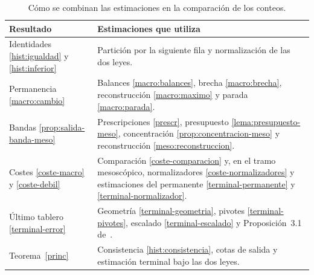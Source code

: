 \begin{table}[htbp]\centering\small
\caption{Cómo se combinan las estimaciones en la comparación de los conteos.}
\begin{tabular}{@{}p{.31\linewidth}p{.59\linewidth}@{}}
\toprule Resultado & Estimaciones que utiliza \\ \midrule
Identidades \ref{hist:igualdad} y \ref{hist:inferior} & Partición por la siguiente fila y
normalización de las dos leyes.\\
Permanencia \ref{macro:cambio} & Balances \ref{macro:balances}, brecha \ref{macro:brecha},
reconstrucción \ref{macro:maximo} y parada \ref{macro:parada}.\\
Bandas \ref{prop:salida-banda-meso} & Prescripciones \eqref{prescr}, presupuesto
\ref{lema:presupuesto-meso}, concentración \ref{prop:concentracion-meso} y reconstrucción
\ref{meso:reconstruccion}.\\
Costes \ref{coste-macro} y \ref{coste-debil} & Comparación \ref{coste-comparacion} y, en el tramo
mesoscópico, normalizadores \ref{coste-normalizadores} y estimaciones del permanente
\ref{terminal-permanente} y \ref{terminal-normalizador}.\\
Último tablero \ref{terminal-error} & Geometría \ref{terminal-geometria}, pivotes
\ref{terminal-pivotes}, escalado \ref{terminal-escalado} y Proposición~3.1 de~\cite{dw}.\\
Teorema~\ref{princ} & Consistencia \ref{hist:consistencia}, cotas de salida y estimación
terminal bajo las dos leyes.\\ \bottomrule
\end{tabular}
\end{table}
\FloatBarrier

